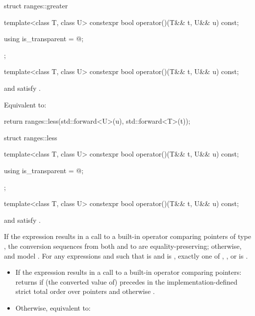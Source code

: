 %
\begin{codeblock}
struct ranges::greater {
  template<class T, class U>
  constexpr bool operator()(T&& t, U&& u) const;

  using is_transparent = @\unspecnc@;
};
\end{codeblock}

\begin{itemdecl}
template<class T, class U>
  constexpr bool operator()(T&& t, U&& u) const;
\end{itemdecl}

\begin{itemdescr}
\pnum
\constraints
{} and  satisfy .

\pnum
\effects
Equivalent to:
\begin{codeblock}
return ranges::less{}(std::forward<U>(u), std::forward<T>(t));
\end{codeblock}
\end{itemdescr}

%
\begin{codeblock}
struct ranges::less {
  template<class T, class U>
    constexpr bool operator()(T&& t, U&& u) const;

  using is_transparent = @\unspecnc@;
};
\end{codeblock}

\begin{itemdecl}
template<class T, class U>
  constexpr bool operator()(T&& t, U&& u) const;
\end{itemdecl}

\begin{itemdescr}
\pnum
\constraints
{} and  satisfy .

\pnum
\expects
If the expression  results in a
call to a built-in operator \tcode{<} comparing pointers of type , the
conversion sequences from both  and  to  are
equality-preserving;
otherwise,  and  model .
For any expressions
 and  such that  is  and
 is , exactly one of
,
, or
is .

\pnum
\effects
\begin{itemize}
\item
If the expression  results in a
call to a built-in operator \tcode{<} comparing pointers:
returns  if (the converted value of)  precedes  in
the implementation-defined strict total order over pointers
and otherwise .

\item
Otherwise, equivalent to:
\end{itemize}
\end{itemdescr}

